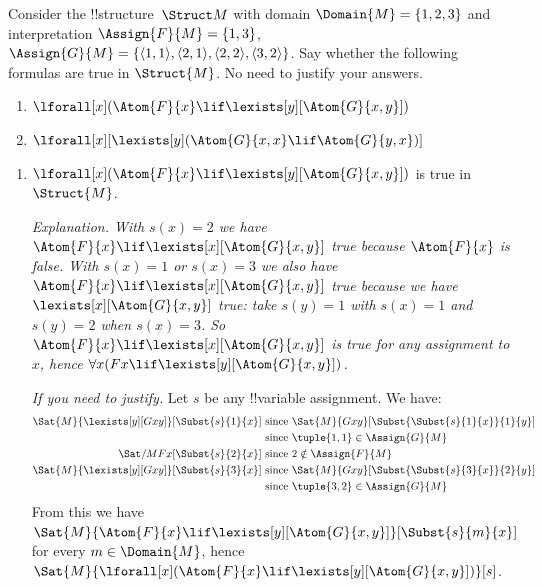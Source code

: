 \documentclass[../../../include/open-logic-section]{subfiles}
\begin{document}


\begin{prob}

    Consider the !!{structure}~$\Struct M$ with domain 
    $\Domain{M}=\{1,2,3\}$ and interpretation
    $\Assign{F}{M}=\{1,3\}$, $\Assign{G}{M}=\{\langle1,1\rangle,\langle2,1\rangle,\langle2,2\rangle,\langle3,2\rangle\}$.
    Say whether the following formulas are true in $\Struct{M}$. No
    need to justify your answers.
    \begin{enumerate}
    \item $\lforall[x](\Atom{F}{x}\lif\lexists[y][\Atom{G}{x,y}])$
    \item $\lforall[x][\lexists[y](\Atom{G}{x,x}\lif \Atom{G}{y,x})]$
    \end{enumerate}

    \begin{ans}
    \begin{enumerate}
    \item $\lforall[x](\Atom{F}{x}\lif\lexists[y][\Atom{G}{x,y}])$ is
    true in $\Struct{M}$.

    \emph{Explanation. With $s(x)=2$ we have
    $\Atom{F}{x}\lif\lexists[x][\Atom{G}{x,y}]$ true because
    $\Atom{F}{x}$ is false. With $s(x)=1$ or $s(x)=3$ we also have
    $\Atom{F}{x}\lif\lexists[x][\Atom{G}{x,y}]$ true because we have
    $\lexists[x][\Atom{G}{x,y}]$ true: take $s(y)=1$ with $s(x)=1$ and
    $s(y)=2$ when $s(x)=3$. So
    $\Atom{F}{x}\lif\lexists[x][\Atom{G}{x,y}]$ is true for any
    assignment to $x$, hence $\forall x(Fx\lif\lexists[y][\Atom{G}{x,y}])$.} 
    
    \emph{If you need to justify.} Let $s$ be any !!{variable} 
    assignment. We have: 
    \begin{align*}
    \Sat{M}{\lexists[y][Gxy]}[\Subst{s}{1}{x}] 
        & \text{ since }\Sat{M}{Gxy}[\Subst{\Subst{s}{1}{x}}{1}{y}] 
    \\
        & \text{ since }\tuple{1,1}\in\Assign{G}{M}
    \\        
    \Sat/{M}{Fx}[\Subst{s}{2}{x}]
        & \text{ since }2\notin\Assign{F}{M}
    \\
    \Sat{M}{\lexists[y][Gxy]}[\Subst{s}{3}{x}] 
        & \text{ since }\Sat{M}{Gxy}[\Subst{\Subst{s}{3}{x}}{2}{y}] 
    \\
        & \text{ since }\tuple{3,2}\in\Assign{G}{M}
    \end{align*}
    From this we have $\Sat{M}{\Atom{F}{x}\lif\lexists[y][\Atom{G}{x,y}]}[\Subst{s}{m}{x}]$
    for every $m\in\Domain{M}$, hence $\Sat{M}{\lforall[x](\Atom{F}{x}\lif\lexists[y][\Atom{G}{x,y}])}[s]$.


\end{enumerate}
\end{ans}
\end{prob}
\end{document}
